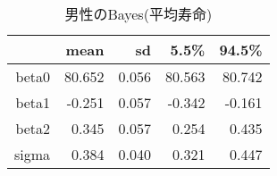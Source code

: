 \begin{table}[ht]
\centering
\begingroup\tiny
\begin{tabular}{rrrrr}
  \hline
 & mean & sd & 5.5\% & 94.5\% \\ 
  \hline
beta0 & 80.652 & 0.056 & 80.563 & 80.742 \\ 
  beta1 & -0.251 & 0.057 & -0.342 & -0.161 \\ 
  beta2 & 0.345 & 0.057 & 0.254 & 0.435 \\ 
  sigma & 0.384 & 0.040 & 0.321 & 0.447 \\ 
   \hline
\end{tabular}
\endgroup
\caption{男性のBayes(平均寿命)} 
\label{table_Gamma_HLE_FA_m}
\end{table}
